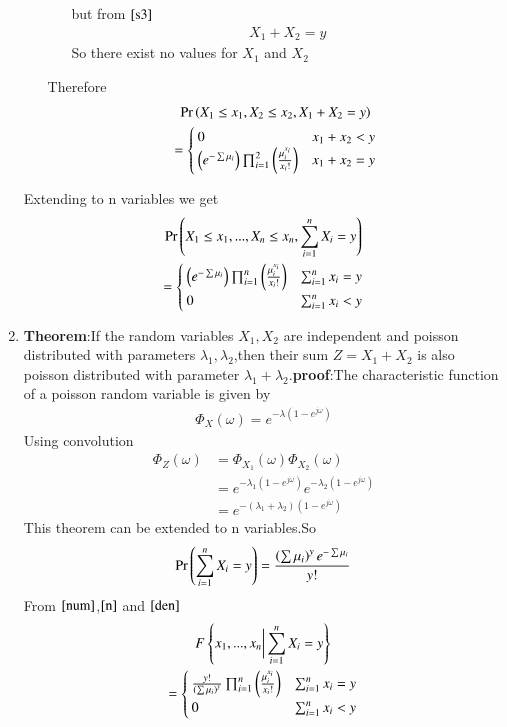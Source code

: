 \documentclass[journal,12pt,twocolumn]{IEEEtran}
\begin{document}
\begin{enumerate}
\begin{enumerate}
\begin{enumerate}
        but from $\eqref{s3}$
        \begin{align}
            X_1+X_2=y
        \end{align}
        So there exist no values for $X_1$ and $X_2$
    \end{enumerate}
    Therefore
    \begin{multline}
        \Pr\left(X_1\leq x_1,X_2\leq x_2,X_1+X_2=y\right)\\=
        \begin{cases}
            0 & x_1+x_2< y\\
            \left(e^{-\sum\mu_i}\right)\prod_{i=1}^2\left(\frac{\mu_i^{x_i}}{x_i!}\right) & x_1+x_2=y
        \end{cases}
    \end{multline}
\end{enumerate}
Extending to n variables we get
    \begin{multline}
        \Pr\left(X_1\leq x_1,...,X_n\leq x_n,\sum_{i=1}^{n}X_i=y\right)\\=
        \begin{cases}
         \left(e^{-\sum\mu_i}\right)\prod_{i=1}^n\left(\frac{\mu_i^{x_i}}{x_i!}\right) & \sum_{i=1}^n x_i=y\\
         0 & \sum_{i=1}^n x_i<y
        \end{cases}
        \label{n}
    \end{multline}
\item \textbf{Theorem}:If the random variables $X_1,X_2$ are independent and poisson distributed with parameters $\lambda_1,\lambda_2$,then their sum $Z=X_1+X_2$ is also poisson distributed with parameter $\lambda_1+\lambda_2$.\textbf{proof}:The characteristic function of a poisson random variable is given by
\begin{align}
    \Phi_X(\omega)=e^{-\lambda(1-e^{j\omega})}
\end{align}
Using convolution 
\begin{align}
    \Phi_Z(\omega)&=\Phi_{X_1}(\omega)\Phi_{X_2}(\omega)\\
    &=e^{-\lambda_1(1-e^{j\omega})}e^{-\lambda_2(1-e^{j\omega})}\\
    &=e^{-(\lambda_1+\lambda_2)(1-e^{j\omega})}
\end{align}
This theorem can be extended to n variables.So
\begin{align}
    \Pr\left(\sum_{i=1}^{n}X_i=y\right)=\frac{\left(\sum\mu_i\right)^ye^{-\sum\mu_i}}{y!}\label{den}
\end{align}
From $\eqref{num}$,$\eqref{n}$ and $\eqref{den}$ 
\begin{multline}
     F\left\{x_1,...,x_n\biggr\vert\sum_{i=1}^{n}X_i=y\right\}\\=
     \begin{cases}
      \frac{y!}{\left(\sum\mu_i\right)^y}\prod_{i=1}^n\left(\frac{\mu_i^{x_i}}{x_i!}\right) & \sum_{i=1}^n x_i =y\\
      0 & \sum_{i=1}^n x_i<y
     \end{cases}
\end{multline}
\end{enumerate}
\end{document}

